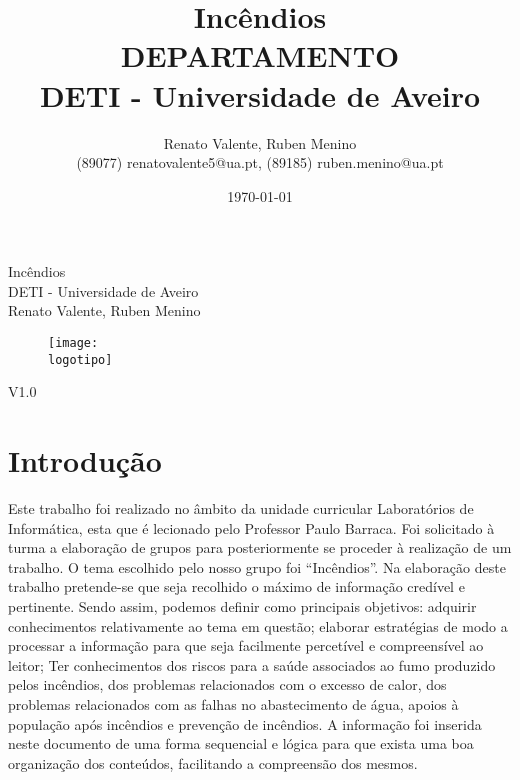 \documentclass{report}
\begin{document}
\def\titulo{Incêndios}
\def\data{\today}
\def\autores{Renato Valente, Ruben Menino}
\def\autorescontactos{(89077) renatovalente5@ua.pt, (89185) ruben.menino@ua.pt}
\def\versao{V1.0}
\def\departamento{DEPARTAMENTO}
\def\empresa{DETI - Universidade de Aveiro}
\def\logotipo{ua.pdf}
%
%
\begin{titlepage}

\begin{center}
%
\vspace*{50mm}
%
{\Huge \titulo}\\ 
%
\vspace{10mm}
%
{\Large \empresa}\\
%
\vspace{10mm}
%
{\LARGE \autores}\\ 
%
\vspace{30mm}
%
\begin{figure}[h]
\center
\texttt{[image: \\logotipo]}
\end{figure}
%
\vspace{30mm}
\end{center}
%
\begin{flushright}
\versao
\end{flushright}
\end{titlepage}

\title{%
{\Huge\textbf{\titulo}}\\
{\Large \departamento\\ \empresa}
}
%
\author{%
    \autores \\
    \autorescontactos
}
%
\date{\data}
%
\maketitle




\chapter{Introdução}

Este trabalho foi realizado no âmbito da unidade curricular Laboratórios de Informática, esta que é lecionado pelo Professor Paulo Barraca. Foi solicitado à turma a elaboração de grupos para posteriormente se proceder à realização de um trabalho. O tema escolhido pelo nosso grupo foi “Incêndios”.
Na elaboração deste trabalho pretende-se que seja recolhido o máximo de informação credível e pertinente.
Sendo assim, podemos definir como principais objetivos: adquirir conhecimentos relativamente ao tema em questão; elaborar estratégias de modo a processar a informação para que seja facilmente percetível e compreensível ao leitor; Ter conhecimentos dos riscos para a saúde associados ao fumo produzido pelos incêndios, dos problemas relacionados com o excesso de calor, dos problemas relacionados com as falhas no abastecimento de água, apoios à população após incêndios e prevenção de incêndios.
A informação foi inserida neste documento de uma forma sequencial e lógica para que exista uma boa organização dos conteúdos, facilitando a compreensão dos mesmos.
\end{document}
